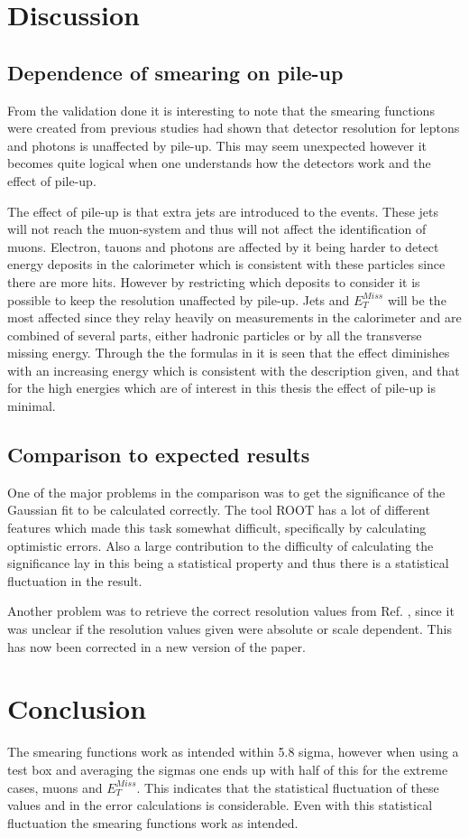 \newpage
\section{Discussion}\label{chap:vali:sec:dis}
\subsection{Dependence of smearing on pile-up}\label{chap:vali:sec:dis:subsec:smearindep}
From the validation done it is interesting to note that the smearing functions were created from previous studies \citep{Electronperf:2011, ATLAS:LOI2} had shown that detector resolution for leptons and photons is unaffected by pile-up. This may seem unexpected however it becomes quite logical when one understands how the detectors work and the effect of pile-up.

The effect of pile-up is that extra jets are introduced to the events. These jets will not reach the muon-system and thus will not affect the identification of muons. Electron, tauons and photons are affected by it being harder to detect energy deposits in the calorimeter which is consistent with these particles since there are more hits. However by restricting which deposits to consider it is possible to keep the resolution unaffected by pile-up. Jets and $E_T^{Miss}$ will be the most affected since they relay heavily on measurements in the calorimeter and are combined of several parts, either hadronic particles or by all the transverse missing energy. Through the the formulas in  it is seen that the effect diminishes with an increasing energy which is consistent with the description given, and that for the high energies which are of interest in this thesis the effect of pile-up is minimal. 

\subsection{Comparison to expected results}
One of the major problems in the comparison was to get the significance of the Gaussian fit to be calculated correctly. The tool ROOT has a lot of different features which made this task somewhat difficult, specifically by calculating optimistic errors. Also a large contribution to the difficulty of calculating the significance lay in this being a statistical property and thus there is a statistical fluctuation in the result. 

Another problem was to retrieve the correct resolution values from Ref. \citep{ATL-PHYS-PUB-2013-004}, since it was unclear if the resolution values given were absolute or scale dependent. This has now been corrected in a new version of the paper.

\section{Conclusion}
The smearing functions work as intended within 5.8 sigma, however when using a test box and averaging the sigmas one ends up with half of this for the extreme cases, muons and $E_T^{Miss}$. This indicates that the statistical fluctuation of these values and in the error calculations is considerable. Even with this statistical fluctuation the smearing functions work as intended.